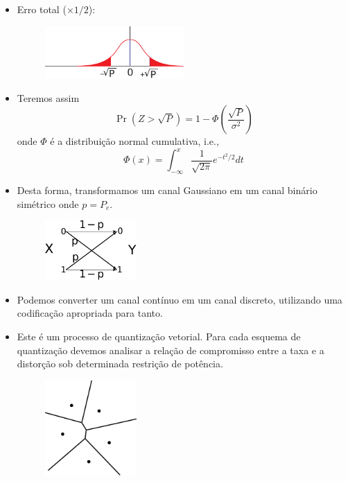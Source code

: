 \begin{frame}[allowframebreaks]
\begin{itemize}
  \item Erro total ($\times 1/2$):

  \begin{figure}[h!]
  \centering
  \includegraphics[width=0.5\textwidth]{images/gausschanexerror2.pdf}
  \label{fig:gausschanexerror2}
  \end{figure}

  \item Teremos assim
	\begin{equation}
	\Pr(Z > \sqrt{P}) = 1 - \Phi \left( \frac{\sqrt{P}}{\sigma^2} \right)
	\end{equation}
	onde $\Phi$ é a distribuição normal cumulativa, i.e.,
	\begin{equation}
	\Phi (x) = \int_{-\infty}^{x} \frac{1}{\sqrt{2 \pi}} e^{-t^2 / 2} dt
	\end{equation}

  \item Desta forma, transformamos um canal Gaussiano em um canal binário simétrico onde $p = P_e$.

  \begin{figure}[h!]
  \centering
  \includegraphics[width=0.33\textwidth]{images/bsch.pdf}
  \label{fig:bsch111}
  \end{figure}

  \item Podemos converter um canal contínuo em um canal discreto, utilizando uma codificação
	apropriada para tanto.
 
  \item Este é um processo de quantização vetorial. Para cada esquema de quantização devemos analisar
	a relação de compromisso entre a taxa e a distorção sob determinada restrição de potência.

  \begin{figure}[h!]
  \centering
  \includegraphics[width=0.33\textwidth]{images/voronoi.pdf}
  \label{fig:voronoi}
  \end{figure}

  \end{itemize}
\end{frame}


